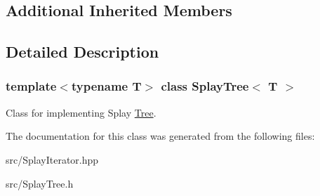\subsection*{Additional Inherited Members}


\subsection{Detailed Description}
\subsubsection*{template$<$typename T$>$\newline
class Splay\+Tree$<$ T $>$}

Class for implementing Splay \hyperlink{classTree}{Tree}. 

The documentation for this class was generated from the following files\+:\begin{DoxyCompactItemize}
\item 
src/Splay\+Iterator.\+hpp\item 
src/Splay\+Tree.\+h\end{DoxyCompactItemize}
